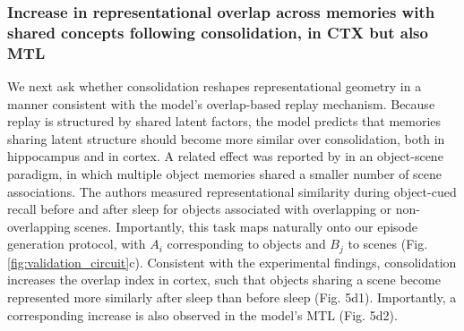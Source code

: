 \documentclass{article}
\begin{document}
\subsubsection*{Increase in representational overlap across memories with shared concepts following consolidation, in CTX but also MTL}
We next ask whether consolidation reshapes representational geometry in a manner consistent with the model's overlap-based replay mechanism. Because replay is structured by shared latent factors, the model predicts that memories sharing latent structure should become more similar over consolidation, both in hippocampus and in cortex.  A related effect was reported by  in an object-scene paradigm, in which multiple object memories shared a smaller number of scene associations. The authors measured representational similarity during object-cued recall before and after sleep for objects associated with overlapping or non-overlapping scenes. Importantly, this task maps naturally onto our episode generation protocol, with $A_i$ corresponding to objects and $B_j$ to scenes (Fig. \ref{fig:validation_circuit}c). Consistent with the experimental findings, consolidation increases the overlap index in cortex, such that objects sharing a scene become represented more similarly after sleep than before sleep (Fig. 5d1). Importantly, a corresponding increase is also observed in the model's MTL (Fig. 5d2).
\end{document}
